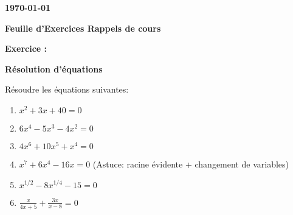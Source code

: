 \documentclass[a4paper,12pt]{article}
\def\Exam{Feuille d'Exercices \og Rappels de cours \fg}
\def\Date{\today}
\begin{document}
\setcounter{nexo}{1}
\newcommand{\Exo}{\medskip
  {\bf Exercice \arabic{nexo} : }
  \addtocounter{nexo}{1}}
\newcommand{\Pb}{{\bf Problème \arabic{nexo} : } 
\addtocounter{nexo}{1} \bigskip}
{\bf  \hfill \Date \quad ~}
%
\vskip 1cm
%
\centerline{\bf \LARGE \Exam}
%
\vskip 1.5cm
%




\Exo \textbf{Résolution d'équations}

Résoudre les équations suivantes:
\begin{enumerate}
\item $x^2 + 3x + 40 = 0$
\item $6x^4 - 5x^3 - 4x^2 = 0$
\item $4x^6 + 10x^5 + x^4 = 0$
\item $x^7 + 6x^4 - 16x = 0$ (Astuce: racine évidente + changement de variables)
\item $x^{1/2} - 8x^{1/4} -15 = 0$
\item $\frac{x}{4x + 5} + \frac{3x}{x - 8} = 0$
\end{enumerate}



\end{document}
